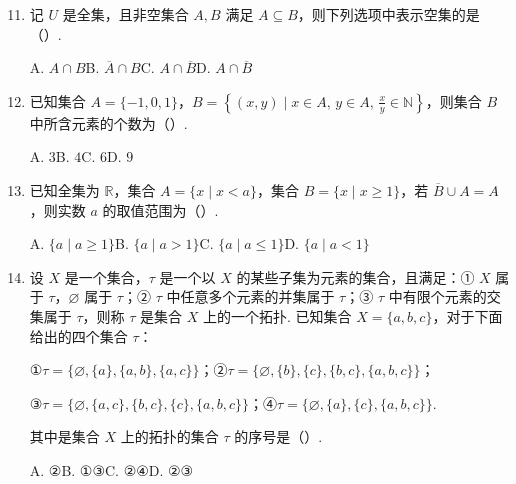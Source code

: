 \documentclass[a4paper,11pt]{article}
\begin{document}
\begin{enumerate}
\setcounter{enumi}{10}

\item 记 $U$ 是全集，且非空集合 $A,B$ 满足 $A\subseteq B$，则下列选项中表示空集的是\mbox{（\quad）.}

\keepwithprev
A. $A\cap B$\qquad B. $\overline{A}\cap B$\qquad C. $A\cap\overline{B}$\qquad D. $A\cap\overline{B}$


\item 已知集合 $A=\{-1,0,1\}$，$B=\left\{(x,y)\mid x\in A,\,y\in A,\,\tfrac{x}{y}\in\mathbb{N}\right\}$，则集合 $B$ 中所含元素的个数为\mbox{（\quad）.}

\keepwithprev
A. $3$\qquad B. $4$\qquad C. $6$\qquad D. $9$


\ifanswer
\solbegin
{}
\solend

\fi

\item 已知全集为 $\mathbb{R}$，集合 $A=\{x\mid x<a\}$，集合 $B=\{x\mid x\geqslant 1\}$，若 $\overline{B}\cup A=A$，则实数 $a$ 的取值范围为\mbox{（\quad）.}

\keepwithprev
A. $\{a\mid a\geqslant 1\}$\qquad B. $\{a\mid a>1\}$\qquad C. $\{a\mid a\leqslant 1\}$\qquad D. $\{a\mid a<1\}$


\item 设 $X$ 是一个集合，$\tau$ 是一个以 $X$ 的某些子集为元素的集合，且满足：① $X$ 属于 $\tau$，$\varnothing$ 属于 $\tau$；② $\tau$ 中任意多个元素的并集属于 $\tau$；③ $\tau$ 中有限个元素的交集属于 $\tau$，则称 $\tau$ 是集合 $X$ 上的一个拓扑. 已知集合 $X=\{a,b,c\}$，对于下面给出的四个集合 $\tau$：

①$\tau=\{\varnothing,\{a\},\{a,b\},\{a,c\}\}$；②$\tau=\{\varnothing,\{b\},\{c\},\{b,c\},\{a,b,c\}\}$；

③$\tau=\{\varnothing,\{a,c\},\{b,c\},\{c\},\{a,b,c\}\}$；④$\tau=\{\varnothing,\{a\},\{c\},\{a,b,c\}\}$.

其中是集合 $X$ 上的拓扑的集合 $\tau$ 的序号是\mbox{（\quad）.}

\keepwithprev
A. ②\qquad B. ①③\qquad C. ②④\qquad D. ②③


\ifanswer
\solbegin
{}
\solend


\end{enumerate}
\end{document}
